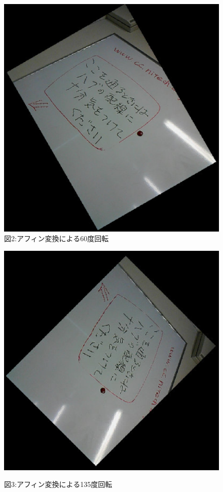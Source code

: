 ﻿\documentclass[a4j,11pt]{jarticle}
\begin{document}
\begin{figure}[tb]
 \begin{minipage}{0.49\hsize} %
   \center
   \includegraphics[width=\hsize]{./eps/affine-60.eps}
   図2:アフィン変換による60度回転
 \end{minipage}
 \begin{minipage}{0.49\hsize} %
   \center
   \includegraphics[width=\hsize]{./eps/affine-135.eps}

   図3:アフィン変換による135度回転
 \end{minipage}
 \label{fig:affine2}
\end{figure}
\end{document}
